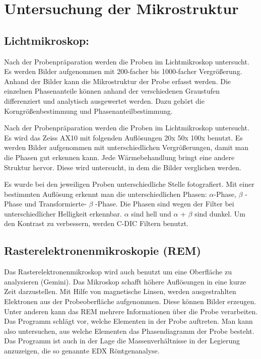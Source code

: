 \section{Untersuchung der Mikrostruktur}
\subsection{Lichtmikroskop:}
Nach der Probenpräparation werden die Proben im Lichtmikroskop untersucht. Es werden Bilder aufgenommen mit 200-facher bis 1000-facher Vergrößerung. Anhand der Bilder kann die Mikrostruktur der Probe erfasst werden. Die einzelnen Phasenanteile können anhand der verschiedenen Graustufen differenziert und analytisch ausgewertet werden. Dazu gehört die Korngrößenbestimmung und Phasenanteilbestimmung. 

Nach der Probenpräparation werden die Proben im Lichtmikroskop untersucht. Es wird das Zeiss AX10 mit folgenden Auflösungen 20x 50x 100x benutzt. Es werden Bilder aufgenommen mit unterschiedlichen Vergrößerungen, damit man die Phasen gut erkennen kann. Jede Wärmebehandlung bringt eine andere Struktur hervor. Diese wird untersucht, in dem die Bilder verglichen werden. 

Es wurde bei den jeweiligen Proben unterschiedliche Stelle fotografiert. Mit einer bestimmten Auflösung erkennt man die unterschiedlichen Phasen: $\alpha$-Phase, $\beta$ -Phase und Transformierte- $\beta$ -Phase. Die Phasen sind wegen der Filter bei unterschiedlicher Helligkeit erkennbar. $\alpha$ sind hell und $\alpha$ + $\beta$ sind dunkel. Um den Kontrast zu verbessern, werden C-DIC Filtern benutzt.


\subsection{Rasterelektronenmikroskopie (REM)}

Das Rasterelektronenmikroskop wird auch benutzt um eine Oberfläche zu analysieren (Gemini). Das Mikroskop schafft höhere Auflösungen in eine kurze Zeit darzustellen. Mit Hilfe von magnetische Linsen, werden ausgestrahlten Elektronen aus der Probeoberfläche aufgenommen.  Diese können Bilder erzeugen. Unter anderen kann das REM mehrere Informationen über die Probe verarbeiten. Das Programm schlägt vor, welche Elementen in der Probe auftreten. Man kann also untersuchen, aus welche Elementen das Phasendiagramm der Probe besteht. Das Programm ist auch in der Lage die Massenverhältnisse in der Legierung anzuzeigen, die so genannte EDX Röntgenanalyse.   

